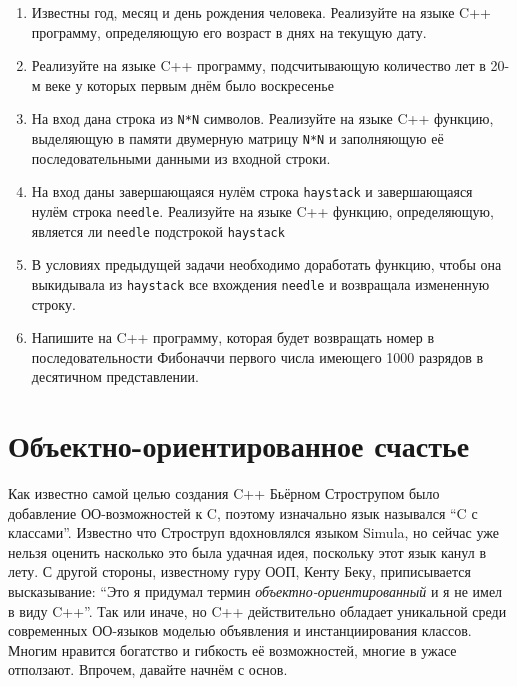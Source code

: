 \documentclass[a4paper,12pt,oneside]{article}
\begin{document}
\begin{enumerate}
\item
Известны год, месяц и день рождения человека. Реализуйте на языке C++ программу, определяющую его возраст в днях на текущую дату.

\item
Реализуйте на языке C++ программу, подсчитывающую количество лет в 20-м веке у которых первым днём было воскресенье

\item
На вход дана строка из \lstinline!N*N! символов. Реализуйте на языке C++ функцию, выделяющую в памяти двумерную матрицу \lstinline!N*N! и заполняющую её последовательными данными из входной строки.

\item
На вход даны завершающаяся нулём строка \lstinline!haystack! и завершающаяся нулём строка \lstinline!needle!. Реализуйте на языке C++ функцию, определяющую, является ли \lstinline!needle! подстрокой \lstinline!haystack!

\item
В условиях предыдущей задачи необходимо доработать функцию, чтобы она выкидывала из \lstinline!haystack! все вхождения \lstinline!needle! и возвращала измененную строку.

\item
Напишите на C++ программу, которая будет возвращать номер в последовательности Фибоначчи первого числа имеющего 1000 разрядов в десятичном представлении.

\end{enumerate}

\pagebreak
\section{Объектно-ориентированное счастье}

Как известно самой целью создания C++ Бьёрном Строструпом было добавление ОО-возможностей к C, поэтому изначально язык назывался ``C с классами''. Известно что Строструп вдохновлялся языком Simula, но сейчас уже нельзя оценить насколько это была удачная идея, поскольку этот язык канул в лету. С другой стороны, известному гуру ООП, Кенту Беку, приписывается высказывание: ``Это я придумал термин \textit{объектно-ориентированный} и я не имел в виду C++''. Так или иначе, но C++ действительно обладает уникальной среди современных ОО-языков моделью объявления и инстанциирования классов. Многим нравится богатство и гибкость её возможностей, многие в ужасе отползают. Впрочем, давайте начнём с основ.
\end{document}
